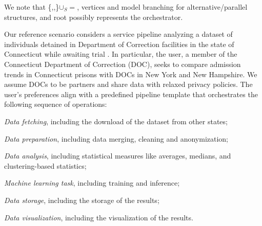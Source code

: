 We note that \{,,\}$\cup$\V$_S$$=$\V, vertices  and  model branching for alternative/parallel structures, and root  possibly represents the orchestrator.

Our reference scenario considers a service pipeline analyzing a dataset of individuals detained in Department of Correction facilities in the state of Connecticut while awaiting trial \cite{toadd}.
In particular, the user, a member of the Connecticut Department of Correction (DOC), seeks to compare admission trends in Connecticut prisons with DOCs in New York and New Hampshire. We assume DOCs to be partners and share data with relaxed privacy policies.
The user's preferences align with a predefined pipeline template that orchestrates the following sequence of operations:
\begin{enumerate*}[label=(\roman*)]
  \item \emph{Data fetching}, including the download of the dataset from other states;
  \item \emph{Data preparation}, including data merging, cleaning and anonymization;
  \item \emph{Data analysis}, including statistical measures like averages, medians, and clustering-based statistics;
  \item \emph{Machine learning task}, including training and inference;
  \item \emph{Data storage}, including the storage of the results;
  \item \emph{Data visualization}, including the visualization of the results.
\end{enumerate*}

